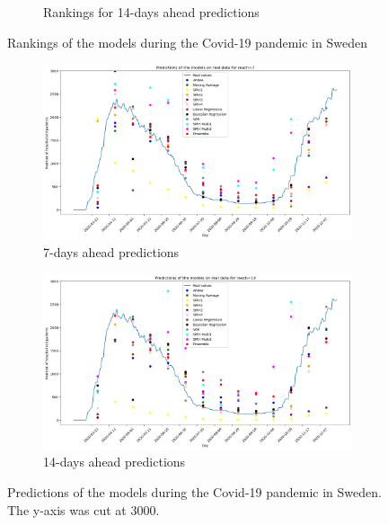 \begin{figure}[h!]
\begin{subfigure}[b]{0.45\textwidth}
      \caption{Rankings for 14-days ahead predictions}
      \label{fig:sousfig2}
    \end{subfigure}
    \caption{Rankings of the models during the Covid-19 pandemic in Sweden}
    \label{fig:rankings_real_data}
\end{figure}


\begin{figure}[h!]
    \centering
    \begin{subfigure}[b]{0.5\textwidth}
      \centering
      \includegraphics[width=\textwidth]{figures/real_data_7.png}  %
      \caption{7-days ahead predictions}
      \label{fig:sousfig1g}
    \end{subfigure}
    \hfill
    \begin{subfigure}[b]{0.5\textwidth}
      \centering
      \includegraphics[width=\textwidth]{figures/real_data_14.png}  %
      \caption{14-days ahead predictions}
      \label{fig:sousfig2g}
    \end{subfigure}
    \caption{Predictions of the models during the Covid-19 pandemic in Sweden. The y-axis was cut at 3000.}
    \label{fig:real_data}
\end{figure}